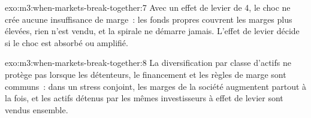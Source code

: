 \begin{solution}{exo:m3:when-markets-break-together:7}
Avec un effet de levier de 4, le choc ne crée aucune insuffisance de marge~: les fonds propres couvrent les marges plus élevées, rien n'est vendu, et la spirale ne démarre jamais. L'effet de levier décide
si le choc est absorbé ou amplifié.
\end{solution}

\begin{solution}{exo:m3:when-markets-break-together:8}
La diversification par classe d'actifs ne protège pas lorsque les détenteurs, le financement et les règles de marge sont communs~: dans un stress conjoint, les marges de la société augmentent
partout à la fois, et les actifs détenus par les mêmes investisseurs à effet de levier sont vendus ensemble.
\end{solution}

